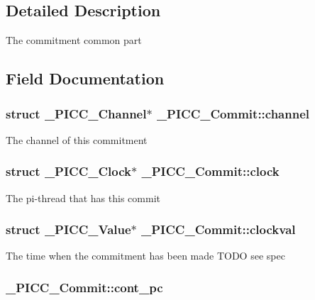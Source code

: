 {\bf }\par



\subsection{Detailed Description}
The commitment common part 

\subsection{Field Documentation}
\hypertarget{struct__PICC__Commit_af80b43fa7c7a1fee8446a6b2efdaab03}{
\subsubsection[{channel}]{\setlength{\rightskip}{0pt plus 5cm}struct {\bf \-\_\-\-P\-I\-C\-C\-\_\-\-Channel}$\ast$ \-\_\-\-P\-I\-C\-C\-\_\-\-Commit\-::channel}}\label{struct__PICC__Commit_af80b43fa7c7a1fee8446a6b2efdaab03}
The channel of this commitment \hypertarget{struct__PICC__Commit_acf28d34611ca5566a2681238e0d105ea}{
\subsubsection[{clock}]{\setlength{\rightskip}{0pt plus 5cm}struct {\bf \-\_\-\-P\-I\-C\-C\-\_\-\-Clock}$\ast$ \-\_\-\-P\-I\-C\-C\-\_\-\-Commit\-::clock}}\label{struct__PICC__Commit_acf28d34611ca5566a2681238e0d105ea}
The pi-\/thread that has this commit \hypertarget{struct__PICC__Commit_ad26ca86d6ec9cf47f14ce4eac9d2dfaf}{
\subsubsection[{clockval}]{\setlength{\rightskip}{0pt plus 5cm}struct {\bf \-\_\-\-P\-I\-C\-C\-\_\-\-Value}$\ast$ \-\_\-\-P\-I\-C\-C\-\_\-\-Commit\-::clockval}}\label{struct__PICC__Commit_ad26ca86d6ec9cf47f14ce4eac9d2dfaf}
The time when the commitment has been made T\-O\-D\-O see spec \hypertarget{struct__PICC__Commit_ad0a2d3efd431b0f5a76713654b08f140}{
\subsubsection[{cont\-\_\-pc}]{ \-\_\-\-P\-I\-C\-C\-\_\-\-Commit\-::cont\-\_\-pc}}\label{struct__PICC__Commit_ad0a2d3efd431b0f5a76713654b08f140}
